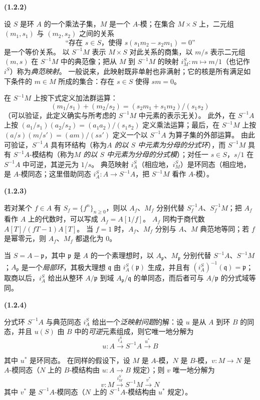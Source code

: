 \documentclass[UTF8,fontset=none,11pt,oneside,openany]{ctexbook}
\newenvironment{env}[1][]{%
  \par\medskip\noindent\textbf{(#1)}\ %
}{\par}
\newcommand{\oldpage}[2][]{%
  \hypertarget{ega-source-page-#1-#2}{}%
  \marginnote{\scriptsize\textbf{#1}~|~#2}\ignorespaces}
\let\EGAOriginalLabel\label
\renewcommand{\label}[1]{\phantomsection\EGAOriginalLabel{#1}}
\begin{document}
\begin{env}[1.2.2]
\label{0.1.2.2-fr}
设 $S$ 是环 $A$ 的一个乘法子集，$M$ 是一个 $A$-模；在集合 $M\times S$ 上，二元组 $(m_1,s_1)$ 与 $(m_2,s_2)$ 之间的关系
\[
  \text{“存在 $s\in S$，使得 $s(s_1m_2-s_2m_1)=0$”}
\]
是一个等价关系。
以 $S^{-1}M$ 表示 $M\times S$ 对此关系的商集，以 $m/s$ 表示二元组 $(m,s)$ 在 $S^{-1}M$ 中的典范像；把从 $M$ 到 $S^{-1}M$ 的映射 $i_M^S:m\mapsto m/1$（也记作 $i^S$）称为\emph{典范映射}。
一般说来，此映射既非单射也非满射；它的核是所有满足如下条件的 $m\in M$ 所成的集合：存在 $s\in S$ 使得 $sm=0$。

在 $S^{-1}M$ 上按下式定义加法群运算：
\[
  (m_1/s_1)+(m_2/s_2)=(s_2m_1+s_1m_2)/(s_1s_2)
\]
（可以验证，此定义确实与所考虑的 $S^{-1}M$ 中元素的表示无关）。
此外，在 $S^{-1}A$ 上按 $(a_1/s_1)(a_2/s_2)=(a_1a_2)/(s_1s_2)$ 定义乘法运算；最后，在 $S^{-1}M$ 上按 $(a/s)(m/s')=(am)/(ss')$ 定义一个以 $S^{-1}A$ 为算子集的外部运算。
由此可验证，$S^{-1}A$ 具有环结构（称为\emph{$A$ 的以 $S$ 中元素为分母的分式环}），而 $S^{-1}M$ 具有 $S^{-1}A$-模结构（称为\emph{$M$ 的以 $S$ 中元素为分母的分式模}）；对任一 $s\in S$，$s/1$ 在 $S^{-1}A$ 中可逆，其逆元为 $1/s$。
典范映射 $i_A^S$（相应地，$i_M^S$）是环同态（相应地，是 $A$-模同态；这里借助同态 $i_A^S:A\to S^{-1}A$，把 $S^{-1}M$ 看作 $A$-模）。
\end{env}

\begin{env}[1.2.3]
\label{0.1.2.3-fr}
若对某个 $f\in A$ 有 $S_f=\{f^n\}_{n\geq 0}$，则以 $A_f$、$M_f$ 分别代替 $S_f^{-1}A$、$S_f^{-1}M$；把 $A_f$ 看作 $A$ 上的代数时，可以写成 $A_f=A[1/f]$。
$A_f$ 同构于商代数 $A[T]/(fT-1)A[T]$。
当 $f=1$ 时，$A_f$、$M_f$ 分别与 $A$、$M$ 典范地等同；若 $f$ 是幂零元，则 $A_f$、$M_f$ 都退化为 $0$。

当 $S=A-\mathfrak{p}$，其中 $\mathfrak{p}$ 是 $A$ 的一个素理想时，以 $A_{\mathfrak{p}}$、$M_{\mathfrak{p}}$ 分别代替 $S^{-1}A$、$S^{-1}M$；$A_{\mathfrak{p}}$ 是一个\emph{局部环}，其极大理想 $\mathfrak{q}$ 由 $i_A^S(\mathfrak{p})$ 生成，并且有 $(i_A^S)^{-1}(\mathfrak{q})=\mathfrak{p}$；取商以后，$i_A^S$ 给出从整环 $A/\mathfrak{p}$ 到域 $A_{\mathfrak{p}}/\mathfrak{q}$ 的单同态，而后者可与 $A/\mathfrak{p}$ 的分式域等同。
\end{env}

\begin{env}[1.2.4]
\label{0.1.2.4-fr}
分式环 $S^{-1}A$ 与典范同态 $i_A^S$ 给出一个\emph{泛映射问题}的解：设 $u$ 是从 $A$ 到环 $B$ 的同态，并且 $u(S)$ 由 $B$ 中的\emph{可逆}元素组成，则它唯一地分解为
\[
  u:A\xrightarrow{i_A^S}S^{-1}A\xrightarrow{u^*}B
\]

\oldpage[0\textsubscript{I}]{14}
其中 $u^*$ 是环同态。
在同样的假设下，设 $M$ 是 $A$-模，$N$ 是 $B$-模，$v:M\to N$ 是 $A$-模同态（$N$ 上的 $B$-模结构由 $u:A\to B$ 规定）；则 $v$ 唯一地分解为
\[
  v:M\xrightarrow{i_M^S}S^{-1}M\xrightarrow{v^*}N
\]
其中 $v^*$ 是 $S^{-1}A$-模同态（$N$ 上的 $S^{-1}A$-模结构由 $u^*$ 规定）。
\end{env}
\end{document}
